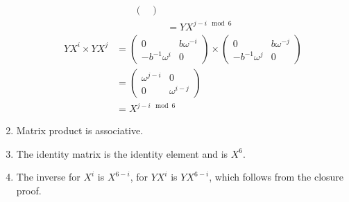 \begin{solution}
\begin{enumerate}
\begin{align*}
\begin{pmatrix}
                  \end{pmatrix}                                                                                  \\
                                  & = YX^{j - i \mod 6}
              \end{align*}
              \begin{align*}
                  YX^i \times YX^j & =
                  \begin{pmatrix}
                      0                   & b\omega^{ - i} \\
                      - b^{ - 1} \omega^i & 0
                  \end{pmatrix} \times \begin{pmatrix}
                      0                   & b\omega^{ - j} \\
                      - b^{ - 1} \omega^j & 0
                  \end{pmatrix} \\
                                   & = \begin{pmatrix}
                      \omega^{j - i} & 0              \\
                      0              & \omega^{i - j}
                  \end{pmatrix}              \\
                                   & = X^{j - i \mod 6}
              \end{align*}
        \item Matrix product is associative.
        \item The identity matrix is the identity element and is \(X^6\).
        \item The inverse for \(X^i\) is \(X^{6 - i}\), for \(YX^i\) is \(YX^{6 - i}\), which follows from the closure proof.
    \end{enumerate}
\end{solution}
